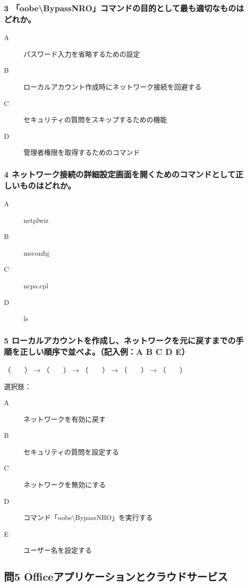 \documentclass[a4paper,6pt]{jsarticle}
\begin{document}
\subsubsection*{3 「oobe\textbackslash{}BypassNRO」コマンドの目的として最も適切なものはどれか。}
\begin{description}
  \item[A] パスワード入力を省略するための設定
  \item[B] ローカルアカウント作成時にネットワーク接続を回避する
  \item[C] セキュリティの質問をスキップするための機能
  \item[D] 管理者権限を取得するためのコマンド
\end{description}

\subsubsection*{4 ネットワーク接続の詳細設定画面を開くためのコマンドとして正しいものはどれか。}
\begin{description}
  \item[A] netplwiz
  \item[B] msconfig
  \item[C] ncpa.cpl
  \item[D] ls
\end{description}

\subsubsection*{5 ローカルアカウントを作成し、ネットワークを元に戻すまでの手順を正しい順序で並べよ。（記入例：A B C D E）}

（　　） → （　　） → （　　） → （　　） → （　　）

\noindent 選択肢： 
\begin{description}
  \item[A] ネットワークを有効に戻す  
  \item[B] セキュリティの質問を設定する  
  \item[C] ネットワークを無効にする  
  \item[D] コマンド「oobe\textbackslash{}BypassNRO」を実行する  
  \item[E] ユーザー名を設定する  
\end{description}

\vspace{-2mm}
\subsection*{問5 Officeアプリケーションとクラウドサービス}
\end{document}

